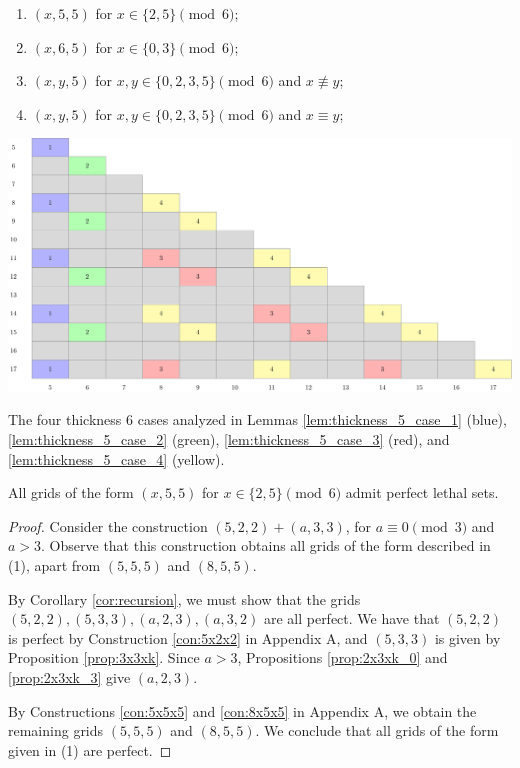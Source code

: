 \begin{enumerate}
\item $(x,5,5)$ for $x \in \{2,5\} \pmod 6$;
\item $(x,6,5)$ for $x \in \{0,3\} \pmod 6$;
\item $(x,y,5)$ for $x,y \in \{0,2,3,5\} \pmod 6$ and $x \not\equiv y$;
\item $(x,y,5)$ for $x,y \in \{0,2,3,5\} \pmod 6$ and $x \equiv y$;
\end{enumerate}

\begin{table}[]
\centering
\includegraphics[width=\textwidth]{tables/4/thickness_5_cases.pdf}
\caption{The four thickness 6 cases analyzed in Lemmas \ref{lem:thickness_5_case_1} (blue), \ref{lem:thickness_5_case_2} (green), \ref{lem:thickness_5_case_3} (red), and \ref{lem:thickness_5_case_4} (yellow).}
\label{fig:thickness_5_cases}
\end{table}


\begin{lem}
\label{lem:thickness_5_case_1}
All grids of the form $(x,5,5)$ for $x \in \{2,5\} \pmod 6$ admit perfect lethal sets.
\end{lem}

\begin{proof}
Consider the construction $(5,2,2) + (a,3,3)$, for $a \equiv 0 \pmod 3$ and $a >3$. Observe that this construction obtains all grids of the form described in (1), apart from $(5,5,5)$ and $(8,5,5)$.

By Corollary \ref{cor:recursion}, we must show that the grids $(5,2,2), (5,3,3), (a,2,3), (a,3,2)$ are all perfect. We have that $(5,2,2)$ is perfect by Construction \ref{con:5x2x2} in Appendix A, and $(5,3,3)$ is given by Proposition \ref{prop:3x3xk}. Since $a >3$, Propositions \ref{prop:2x3xk_0} and \ref{prop:2x3xk_3} give $(a,2,3)$. 

By Constructions \ref{con:5x5x5} and \ref{con:8x5x5} in Appendix A, we obtain the remaining grids $(5,5,5)$ and $(8,5,5)$. We conclude that all grids of the form given in (1) are perfect.
\end{proof}

